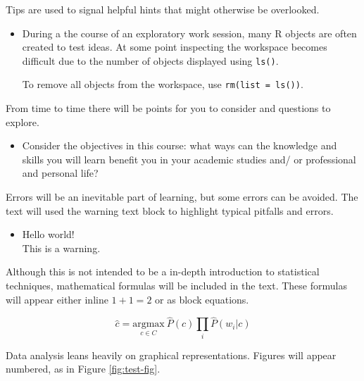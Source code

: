 \documentclass[
]{article}
\newenvironment{rmdblock}[1]
  {\begin{shaded*}
  \begin{itemize}
  \renewcommand{\labelitemi}{
    \raisebox{-.5\height}[0pt][0pt]{
      {\setkeys{Gin}{width=2em,keepaspectratio}\texttt{[image: assets/images/\#1]}}
    }
  }
  \item
  }
  {
  \end{itemize}
  \end{shaded*}
  }
\newenvironment{rmdtip}
  {\begin{rmdblock}{tip}}
  {\end{rmdblock}}
\newenvironment{rmdwarning}
  {\begin{rmdblock}{warning}}
  {\end{rmdblock}}
\newenvironment{rmdquestion}
  {\begin{rmdblock}{question}}
  {\end{rmdblock}}
\begin{document}
Tips are used to signal helpful hints that might otherwise be overlooked.

\begin{rmdtip}
During a the course of an exploratory work session, many R objects are
often created to test ideas. At some point inspecting the workspace
becomes difficult due to the number of objects displayed using
\texttt{ls()}.

To remove all objects from the workspace, use
\texttt{rm(list\ =\ ls())}.
\end{rmdtip}

From time to time there will be points for you to consider and questions to explore.

\begin{rmdquestion}
Consider the objectives in this course: what ways can the knowledge and
skills you will learn benefit you in your academic studies and/ or
professional and personal life?
\end{rmdquestion}

Errors will be an inevitable part of learning, but some errors can be avoided. The text will used the warning text block to highlight typical pitfalls and errors.

\begin{rmdwarning}
Hello world!\\
This is a warning.
\end{rmdwarning}

Although this is not intended to be a in-depth introduction to statistical techniques, mathematical formulas will be included in the text. These formulas will appear either inline \(1 + 1 = 2\) or as block equations.

\begin{equation}
  \hat{c} = \underset{c \in C} {\mathrm{argmax}} ~\hat{P}(c) \prod_i \hat{P}(w_i|c)
  \label{eq:example-formula}
\end{equation}

Data analysis leans heavily on graphical representations. Figures will appear numbered, as in Figure \ref{fig:test-fig}.
\end{document}
